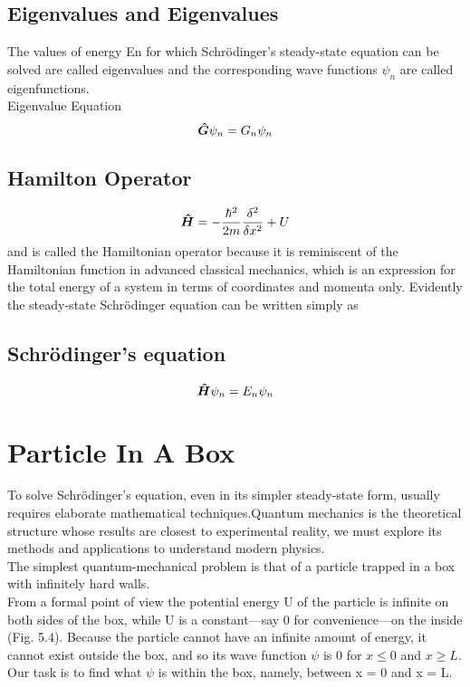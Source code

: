 \documentclass{article}
\begin{document}
\subsection*{Eigenvalues and Eigenvalues}
The values of energy En for which Schrödinger's steady-state equation can be solved are called eigenvalues and the corresponding wave functions $\psi_n$ are called eigenfunctions. \vspace{20pt}
\\
Eigenvalue Equation
\begin{equation}
    \vu*{G}\psi_n=G_n\psi_n
\end{equation}

\subsection*{Hamilton Operator}
\begin{equation}
    \vu*{H}=-\frac{\hbar^2}{2m}\frac{\delta^2}{\delta x^2}+U
\end{equation}
and is called the Hamiltonian operator because it is reminiscent of the Hamiltonian
function in advanced classical mechanics, which is an expression for the total energy
of a system in terms of coordinates and momenta only. Evidently the steady-state
Schrödinger equation can be written simply as
\subsection*{Schrödinger's equation}
\begin{equation}
    \vu*{H}\psi_n=E_n\psi_n
\end{equation}

\break

\section*{Particle In A Box}
To solve Schrödinger's equation, even in its simpler steady-state form, usually requires elaborate mathematical techniques.Quantum mechanics is the theoretical structure
whose results are closest to experimental reality, we must explore its methods and applications to understand modern physics.\vspace{4pt}
\\
The simplest quantum-mechanical problem is that of a particle trapped in a box
with infinitely hard walls.
\\
From a formal point of view the potential energy U of the particle is infinite on both sides of
the box, while U is a constant—say 0 for convenience—on the inside (Fig. 5.4). Because
the particle cannot have an infinite amount of energy, it cannot exist outside the box,
and so its wave function $\psi$ is 0 for $x\le0$ and $x\ge L$. Our task is to find what $\psi$ is
within the box, namely, between x = 0 and x = L.
\end{document}
